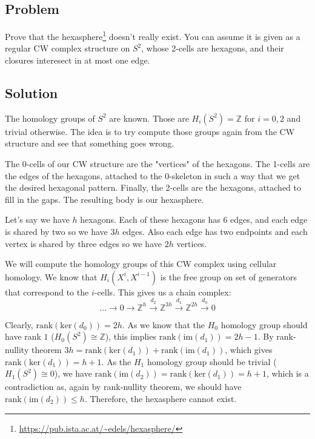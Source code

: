 \documentclass{article}
\begin{document}
\subsection*{Problem}
Prove that the hexasphere\footnote{\url{https://pub.ista.ac.at/~edels/hexasphere/}} doesn't really exist. You can assume it is given as a regular CW complex structure on $S^2$, whose
2-cells are hexagons, and their closures interesect in at most one edge.
\subsection*{Solution}
The homology groups of $S^2$ are known. Those are $H_i(S^2) = \mathbb{Z}$ for $i=0,2$ and trivial otherwise. The idea is to try compute those groups again from the CW structure and see that something goes wrong.


The 0-cells of our CW structure are the "{}vertices"{} of the hexagons.
The 1-cells are the edges of the hexagons, attached to the 0-skeleton in such a way that we get the desired hexagonal pattern.
Finally, the 2-cells are the hexagons, attached to fill in the gaps. The resulting body is our hexasphere.

Let's say we have $h$ hexagons. Each of these hexagons has 6 edges, and each edge is shared by two so we have $3h$ edges. Also each edge has two endpoints and each vertex is shared by three edges so we have $2h$ vertices.

We will compute the homology groups of this CW complex using cellular homology. We know that $H_i(X^i,X^{i-1})$ is the free group on set of generators that correspond to the $i$-cells.
This gives us a chain complex:
\begin{equation*}
\dots \xrightarrow{} 0 \xrightarrow{} \mathbb{Z}^h \xrightarrow{d_2} \mathbb{Z}^{3h} \xrightarrow{d_1} \mathbb{Z}^{2h} \xrightarrow{d_0} 0
\end{equation*}

Clearly, $\mathrm{rank} (\mathrm{ker}(d_0)) = 2h$. As we know that the $H_0$ homology group should have rank $1$ ($H_0(S^2) \cong \mathbb{Z}$), this implies $\mathrm{rank}(\mathrm{im}(d_1)) = 2h-1$. By rank-nullity theorem $3h = \mathrm{rank}(\mathrm{ker}(d_1)) + \mathrm{rank}(\mathrm{im}(d_1))$, which gives $\mathrm{rank}(\mathrm{ker}(d_1)) = h+1$. As the $H_1$ homology group should be trivial ($H_1(S^2) \cong 0$), we have $\mathrm{rank}(\mathrm{im}(d_2)) = \mathrm{rank}(\mathrm{ker}(d_1)) = h+1$, which is a contradiction as, again by rank-nullity theorem, we should have $\mathrm{rank}(\mathrm{im}(d_2)) \leq h$. Therefore, the hexasphere cannot exist.
\end{document}
